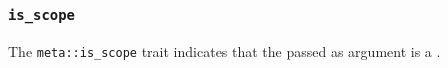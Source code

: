 
\subsubsection{\texttt{is\_scope}}

The \texttt{meta::is\_scope}
trait indicates that the  passed as argument is a .


